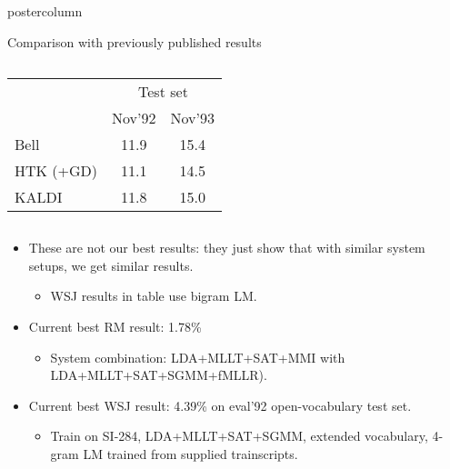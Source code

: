 \documentclass[final,hyperref={pdfpagelabels=false}]{beamer}
\begin{document}
\begin{frame}[fragile]
\begin{columns}
\begin{column}{.33\textwidth}
\begin{beamercolorbox}[center,wd=\textwidth]{postercolumn}
\begin{minipage}[T]{.95\textwidth}
{\begin{block}{Comparison with previously published results}
\begin{columns}
\begin{column}{.5\textwidth}
                  \begin{table}
                    \small
                    \centering
                    \begin{tabular}{@{} l @{} c c@{}}
                      \toprule 
                      & \multicolumn{2}{c}{    Test set  }   \\ \cmidrule(l){2-3}
                      &  Nov'92      &    Nov'93  \\ 
                      \cmidrule(lr){2-2} \cmidrule(r){3-3}
                      Bell      &  11.9        &  15.4    \\
                      HTK (+GD)  &  11.1        &  14.5   \\ 
                      KALDI      &  11.8        &  15.0   \\ \bottomrule
                    \end{tabular}
                  \end{table}
                \end{column}
              \end{columns}
              \begin{itemize}
              \item These are not our best results: they just show that with similar system setups, we get similar results.
                \begin{itemize}
                \item WSJ results in table use bigram LM.
                \end{itemize}
              \item Current best RM result: 1.78\% 
                \begin{itemize}
                \item System combination: LDA+MLLT+SAT+MMI with LDA+MLLT+SAT+SGMM+fMLLR).
                \end{itemize}
              \item Current best WSJ result: 4.39\% on eval'92 open-vocabulary test set.
                \begin{itemize}
                \item Train on SI-284, LDA+MLLT+SAT+SGMM, extended vocabulary, 4-gram LM trained from supplied trainscripts.
                \end{itemize}
              \end{itemize}
            \end{block}
}
\end{minipage}
\end{beamercolorbox}
\end{column}
\end{columns}
\end{frame}
\end{document}
